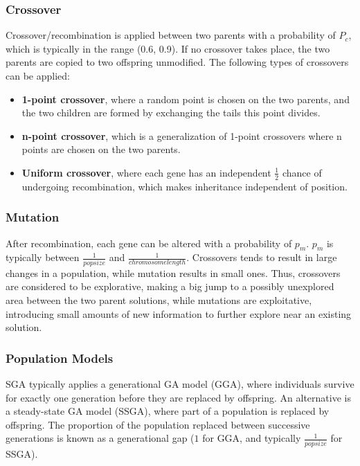 \documentclass[12pt,titlepage]{article}
\begin{document}
      \subsubsection{Crossover}
        Crossover/recombination is applied between two parents with a probability of $P_c$, which is typically in the range (0.6, 0.9). If no crossover takes place, the two parents
        are copied to two offspring unmodified. The following types of crossovers can be applied:
        \begin{itemize}
          \item \textbf{1-point crossover}, where a random point is chosen on the two parents, and the two children are formed by exchanging the tails this point divides.
          \item \textbf{n-point crossover}, which is a generalization of 1-point crossovers where n points are chosen on the two parents.
          \item \textbf{Uniform crossover}, where each gene has an independent $\frac{1}{2}$ chance of undergoing recombination, which makes inheritance independent of position.
        \end{itemize}

      \subsubsection{Mutation}
        After recombination, each gene can be altered with a probability of $p_m$. $p_m$ is typically between $\frac{1}{popsize}$ and $\frac{1}{chromosomelength}$. Crossovers
        tends to result in large changes in a population, while mutation results in small ones. Thus, crossovers are considered to be explorative, making a big jump to a
        possibly unexplored area between the two parent solutions, while mutations are exploitative, introducing small amounts of new information to further explore near an
        existing solution.

      \subsubsection{Population Models}
        SGA typically applies a generational GA model (GGA), where individuals survive for exactly one generation before they are replaced by offspring. An alternative is a
        steady-state GA model (SSGA), where part of a population is replaced by offspring. The proportion of the population replaced between successive generations is known as a
        generational gap ($1$ for GGA, and typically $\frac{1}{popsize}$ for SSGA).
\end{document}

